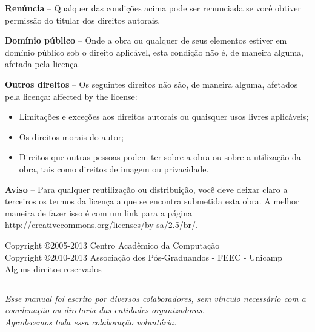 \noindent
\textbf{Renúncia} -- Qualquer das condições acima pode ser renunciada se você obtiver permissão do titular dos direitos autorais.

\vspace{1em}
\noindent
\textbf{Domínio público} -- Onde a obra ou qualquer de seus elementos estiver em domínio público sob o direito aplicável, esta condição não é, de maneira alguma, afetada pela licença.

\vspace{1em}
\noindent
\textbf{Outros direitos} -- Os seguintes direitos não são, de maneira alguma, afetados pela licença: 
affected by the license:

\begin{itemize}
\item Limitações e exceções aos direitos autorais ou quaisquer usos livres aplicáveis;
\item Os direitos morais do autor;
\item Direitos que outras pessoas podem ter sobre a obra ou sobre a utilização da obra, tais como direitos de imagem ou privacidade.
\end{itemize}

\vspace{1em}
\noindent
\textbf{Aviso} -- Para qualquer reutilização ou distribuição, você deve deixar claro a terceiros os termos da licença a que se encontra submetida esta obra. A melhor maneira de fazer isso é com um link para a página \url{http://creativecommons.org/licenses/by-sa/2.5/br/}.

\begin{center}
Copyright \copyright 2005-2013 Centro Acadêmico da Computação \\
Copyright \copyright 2010-2013 Associação dos Pós-Graduandos - FEEC - Unicamp \\
Alguns direitos reservados

\vspace{1em}
\rule{\linewidth}{0.5mm}
\vspace{1em}

\emph{Esse manual foi escrito por diversos colaboradores, sem vínculo necessário com a coordenação ou diretoria das entidades organizadoras. \\
Agradecemos toda essa colaboração voluntária.}
\end{center}

\clearpage

\thispagestyle{empty}


